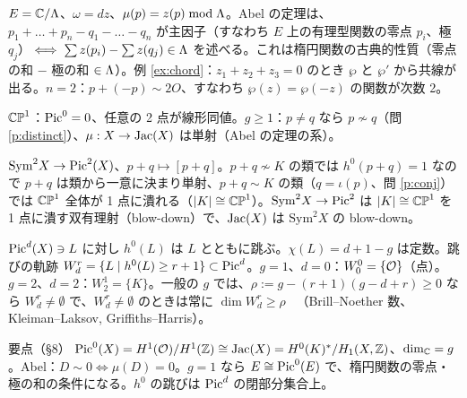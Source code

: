 \begin{ex}[$g=1$：Abel の定理と楕円関数]\label{ex:abelg1}
$E=\mathbb C/\Lambda$、$\omega=dz$、$\mu(p)=z(p)\bmod\Lambda$。Abel の定理は、$p_1+\dots+p_n-q_1-\dots-q_n$ が主因子（すなわち $E$ 上の有理型関数の零点 $p_i$、極 $q_j$）$\iff\sum z(p_i)-\sum z(q_j)\in\Lambda$ を述べる。これは楕円関数の古典的性質（零点の和 $-$ 極の和 $\in\Lambda$）。例 \ref{ex:chord}：$z_1+z_2+z_3=0$ のとき $\wp$ と $\wp'$ から共線が出る。$n=2$：$p+(-p)\sim2O$、すなわち $\wp(z)=\wp(-z)$ の関数が次数 2。
\end{ex}
\begin{ex}[$g=0$ と $g\ge1$ の違い]
$\mathbb{CP}^1$：$\mathrm{Pic}^0=0$、任意の 2 点が線形同値。$g\ge1$：$p\ne q$ なら $p\not\sim q$（問 \ref{p:distinct}）、$\mu:X\to\mathrm{Jac}(X)$ は単射（Abel の定理の系）。
\end{ex}
\begin{ex}[$g=2$：$\mathrm{Sym}^2X\to\Jac(X)$]
$\mathrm{Sym}^2X\to\mathrm{Pic}^2(X)$、$p+q\mapsto[p+q]$。$p+q\not\sim K$ の類では $h^0(p+q)=1$ なので $p+q$ は類から一意に決まり単射、$p+q\sim K$ の類（$q=\iota(p)$、問 \ref{p:conj}）では $\mathbb{CP}^1$ 全体が 1 点に潰れる（$|K|\cong\mathbb{CP}^1$）。$\mathrm{Sym}^2X\to\mathrm{Pic}^2$ は $|K|\cong\mathbb{CP}^1$ を 1 点に潰す双有理射（blow-down）で、$\mathrm{Jac}(X)$ は $\mathrm{Sym}^2X$ の blow-down。
\end{ex}
\begin{ex}\label{ex:BN}
$\mathrm{Pic}^d(X)\ni L$ に対し $h^0(L)$ は $L$ とともに跳ぶ。$\chi(L)=d+1-g$ は定数。跳びの軌跡 $W_d^r=\{L\mid h^0(L)\ge r+1\}\subset\mathrm{Pic}^d$。$g=1$、$d=0$：$W^0_0=\{\mathcal O\}$（点）。$g=2$、$d=2$：$W^1_2=\{K\}$。一般の $g$ では、$\rho:=g-(r+1)(g-d+r)\ge0$ なら $W^r_d\ne\emptyset$ で、$W^r_d\ne\emptyset$ のときは常に $\dim W^r_d\ge\rho$ \tC\ （Brill--Noether 数、Kleiman--Laksov, Griffiths--Harris）。
\end{ex}

\begin{keybox}{要点（§8）}
$\mathrm{Pic}^0(X)=H^1(\mathcal O)/H^1(\mathbb Z)\cong\mathrm{Jac}(X)=H^0(K)^*/H_1(X,\mathbb Z)$、$\dim_\mathbb C=g$。Abel：$D\sim0\iff\mu(D)=0$。$g=1$ なら $E\cong\mathrm{Pic}^0(E)$ で、楕円関数の零点・極の和の条件になる。$h^0$ の跳びは $\mathrm{Pic}^d$ の閉部分集合上。
\end{keybox}

